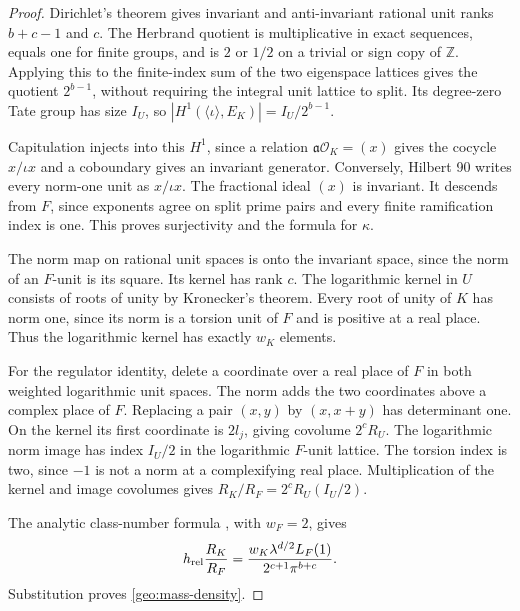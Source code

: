 \begin{proof}
Dirichlet's theorem gives invariant and anti-invariant rational unit
ranks $b+c-1$ and $c$. The Herbrand quotient is multiplicative in exact
sequences, equals one for finite groups, and is $2$ or $1/2$ on a trivial
or sign copy of $\mathbb Z$. Applying this to the finite-index sum of
the two eigenspace lattices gives the quotient $2^{b-1}$, without
requiring the integral unit lattice to split.
Its degree-zero Tate group has size $I_U$, so
$|H^1(\langle\iota\rangle,E_K)|=I_U/2^{b-1}$.

Capitulation injects into this $H^1$, since a relation
$\mathfrak a\mathcal O_K=(x)$ gives the cocycle $x/\iota x$ and a
coboundary gives an invariant generator. Conversely, Hilbert 90
writes every norm-one unit as $x/\iota x$. The fractional ideal $(x)$ is
invariant. It descends from $F$, since exponents agree on split prime
pairs and every finite ramification index is one. This proves
surjectivity and the formula for $\kappa$.

The norm map on rational unit spaces is onto the invariant space, since
the norm of an $F$-unit is its square. Its kernel has rank $c$.
The logarithmic kernel in $U$ consists of roots of unity by Kronecker's
theorem. Every root of unity of $K$ has norm one, since its norm is a
torsion unit of $F$ and is positive at a real place.
Thus the logarithmic kernel has exactly $w_K$ elements.

For the regulator identity, delete a coordinate over a real place of
$F$ in both weighted logarithmic unit spaces. The norm adds the two
coordinates above a complex place of $F$. Replacing a pair $(x,y)$ by
$(x,x+y)$ has determinant one. On the kernel its first coordinate is
$2l_j$, giving covolume $2^cR_U$. The logarithmic norm image has index
$I_U/2$ in the logarithmic $F$-unit lattice. The torsion index is two,
since $-1$ is not a norm at a complexifying real place. Multiplication
of the kernel and image covolumes gives
$R_K/R_F=2^cR_U(I_U/2)$.

The analytic class-number formula
\cite[Chapter~V, Theorem~2.4]{MilneCFT}, with $w_F=2$, gives
\[
 h_{\rm rel}\frac{R_K}{R_F}
 =\frac{w_K\lambda^{d/2}L_F(1)}{2^{c+1}\pi^{b+c}}.
\]
Substitution proves \eqref{geo:mass-density}.
\end{proof}

